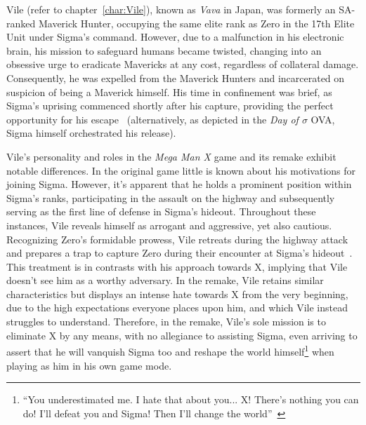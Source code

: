 Vile (refer to chapter~\ref{char:Vile}), known as \textit{Vava} in Japan, was formerly an SA-ranked Maverick Hunter, occupying the same elite rank as Zero in the 17th Elite Unit under Sigma's command. However, due to a malfunction in his electronic brain, his mission to safeguard humans became twisted, changing into an obsessive urge to eradicate Mavericks at any cost, regardless of collateral damage. Consequently, he was expelled from the Maverick Hunters and incarcerated on suspicion of being a Maverick himself. His time in confinement was brief, as Sigma's uprising commenced shortly after his capture, providing the perfect opportunity for his escape~\cite{Xcoll1:Manual_X1,MHX:manual, wayback:X_resources} (alternatively, as depicted in the \textit{Day of $\sigma$} OVA, Sigma himself orchestrated his release).

Vile's personality and roles in the \textit{Mega Man X} game and its remake exhibit notable differences. In the original game little is known about his motivations for joining Sigma. However, it's apparent that he holds a prominent position within Sigma's ranks, participating in the assault on the highway and subsequently serving as the first line of defense in Sigma's hideout. Throughout these instances, Vile reveals himself as arrogant and aggressive, yet also cautious. Recognizing Zero's formidable prowess, Vile retreats during the highway attack and prepares a trap to capture Zero during their encounter at Sigma's hideout~\cite{wiki:Vile}. This treatment is in contrasts with his approach towards X, implying that Vile doesn't see him as a worthy adversary. In the remake, Vile retains similar characteristics but displays an intense hate towards X from the very beginning, due to the high expectations everyone places upon him, and which Vile instead struggles to understand. Therefore, in the remake, Vile's sole mission is to eliminate X by any means, with no allegiance to assisting Sigma, even arriving to assert that he will vanquish Sigma too and reshape the world himself\footnote{\enquote{You underestimated me. I hate that about you... X! There's nothing you can do! I'll defeat you and Sigma! Then I'll change the world}~\cite{wiki:MMX_script}} when playing as him in his own game mode.
